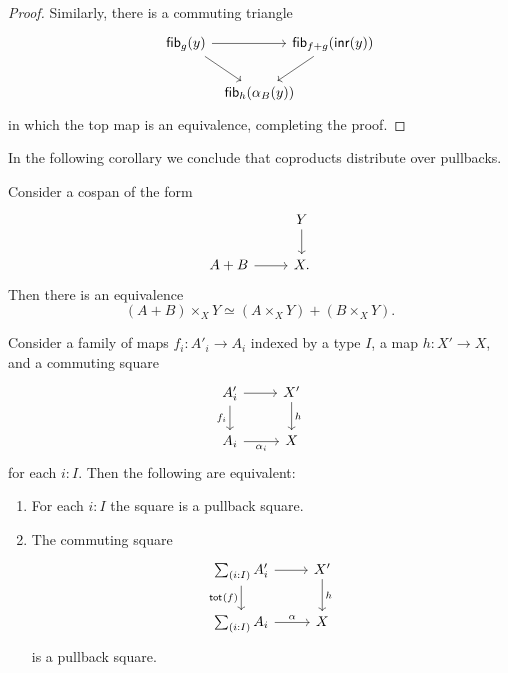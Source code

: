 \begin{proof}
Similarly, there is a commuting triangle
\begin{equation*}
\begin{tikzcd}[column sep=-1em]
\fib{g}{y} \arrow[rr] \arrow[dr] & & \fib{f+g}{\inr(y)} \arrow[dl] \\
\phantom{\fib{f+g}{\inr(y)}} & \fib{h}{\alpha_B(y)}
\end{tikzcd}
\end{equation*}
in which the top map is an equivalence, completing the proof.
\end{proof}

In the following corollary we conclude that coproducts distribute over pullbacks. 

\begin{cor}
Consider a cospan of the form
\begin{equation*}
\begin{tikzcd}
& Y \arrow[d] \\
A+B \arrow[r] & X.
\end{tikzcd}
\end{equation*}
Then there is an equivalence
\begin{equation*}
(A+B)\times_X Y \simeq (A\times_X Y)+(B\times_X Y).
\end{equation*}
\end{cor}

\begin{thm}
Consider a family of maps $f_i:A'_i\to A_i$ indexed by a type $I$, a map $h:X'\to X$, and a commuting square
\begin{equation*}
\begin{tikzcd}
A'_i \arrow[r] \arrow[d,swap,"f_i"] & X' \arrow[d,"h"] \\
A_i \arrow[r,swap,"\alpha_i"] & X
\end{tikzcd}
\end{equation*}
for each $i:I$. Then the following are equivalent:
\begin{enumerate}
\item For each $i:I$ the square is a pullback square.
\item The commuting square
\begin{equation*}
\begin{tikzcd}
\sm{i:I}A'_i \arrow[d,swap,"\total{f}"] \arrow[r] & X' \arrow[d,"h"] \\
\sm{i:I}A_i \arrow[r,"\alpha"] & X
\end{tikzcd}
\end{equation*}
is a pullback square.
\end{enumerate}
\end{thm}

